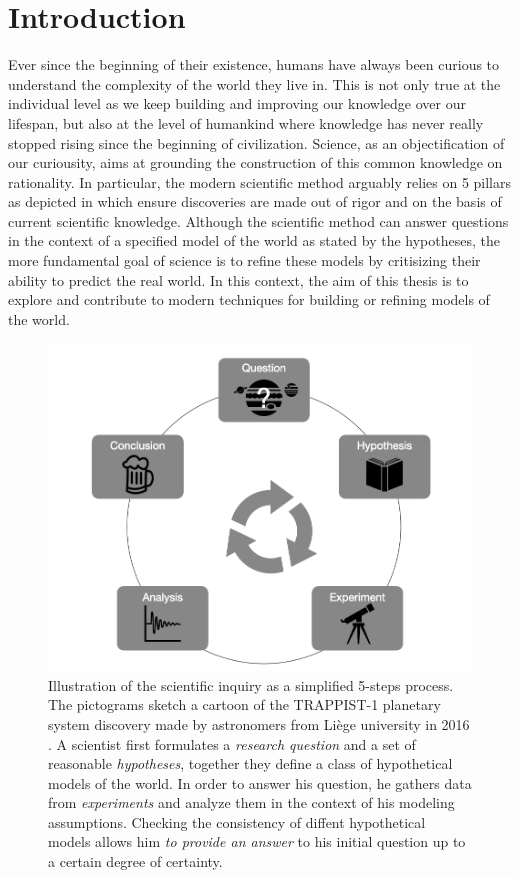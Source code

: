 \chapter{Introduction}\label{ch:introduction}
Ever since the beginning of their existence, humans have always been curious to understand the complexity of the world they live in.
This is not only true at the individual level as we keep building and improving our knowledge over our lifespan,
but also at the level of humankind where knowledge has never really stopped rising since the beginning of civilization.
Science, as an objectification of our curiousity, aims at grounding the construction of this common knowledge on rationality. In particular, the modern scientific method
arguably relies on 5 pillars as depicted in  which ensure discoveries are made out of rigor and on the basis of current scientific knowledge.
Although the scientific method can answer questions in the context of a specified model of the world as stated by the hypotheses, the more fundamental goal of science is to refine these models by critisizing their ability to predict the real world. In this context, the aim of this thesis is to explore and contribute to modern techniques for building or refining models of the world.
\begin{figure}[h]
  \centering
  \includegraphics[width=.8\textwidth]{figures/chapter01/trapist_disco.png}
  \caption{Illustration of the scientific inquiry as a simplified 5-steps process.
  The pictograms sketch a cartoon of the TRAPPIST-1 planetary system discovery made by astronomers from Li{\`e}ge university in 2016 \citep{gillon2017seven}.
  A scientist first formulates a \textit{research question} and a set of reasonable \textit{hypotheses}, together they define a class of hypothetical models of the world.
  In order to answer his question, he gathers data from \textit{experiments} and analyze them in the context of his modeling assumptions. Checking the consistency of diffent hypothetical models allows him \textit{to provide an answer} to his initial question up to a certain degree of certainty.}
  \label{fig:ch01:scientific_method}
\end{figure}

